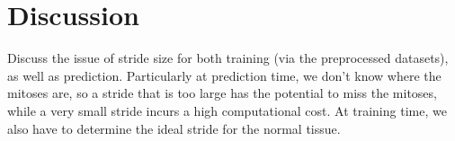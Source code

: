 \section{Discussion}
Discuss the issue of stride size for both training (via the preprocessed datasets), as well as prediction.  Particularly at prediction time, we don't know where the mitoses are, so a stride that is too large has the potential to miss the mitoses, while a very small stride incurs a high computational cost.  At training time, we also have to determine the ideal stride for the normal tissue.

